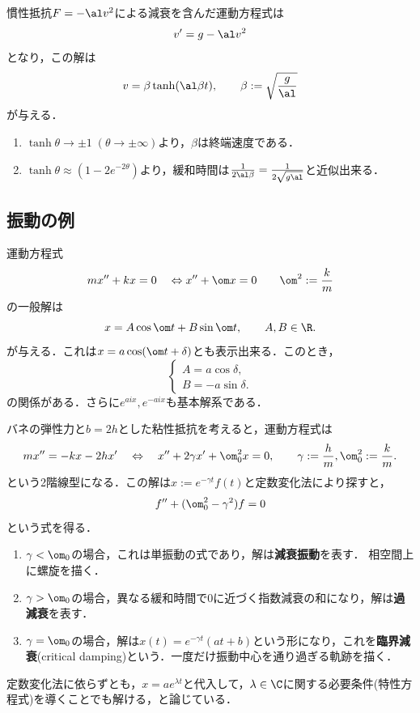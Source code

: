 \documentclass[uplatex,dvipdfmx]{jsreport}
\begin{document}
\begin{model}
    慣性抵抗$F=-\al v^2$による減衰を含んだ運動方程式は
    \[v'=g-\al v^2\]
    となり，この解は
    \[v=\beta\tanh(\al\beta t),\qquad\beta:=\sqrt{\frac{g}{\al}}\]
    が与える．
    \begin{enumerate}
        \item $\tanh\theta\to\pm1\;(\theta\to\pm\infty)$より，$\beta$は終端速度である．
        \item $\tanh\theta\approx(1-2e^{-2\theta})$より，緩和時間は$\frac{1}{2\al\beta}=\frac{1}{2\sqrt{g\al}}$と近似出来る．
    \end{enumerate}
\end{model}

\subsection{振動の例}

\begin{model}\label{model-単振動}
    運動方程式
    \[mx''+kx=0\quad\Leftrightarrow x''+\om x=0\qquad\om^2:=\frac{k}{m}\]
    の一般解は
    \[x=A\cos\om t+B\sin\om t,\qquad A,B\in\R.\]
    が与える．これは$x=a\cos(\om t+\delta)$とも表示出来る．このとき，
    \[\begin{cases}
        A=a\cos\delta,\\
        B=-a\sin\delta.
    \end{cases}\]
    の関係がある．さらに$e^{aix},e^{-aix}$も基本解系である．
\end{model}

\begin{model}
    バネの弾性力と$b=2h$とした粘性抵抗を考えると，運動方程式は
    \[mx''=-kx-2hx'\quad\Leftrightarrow\quad x''+2\gamma x'+\om_0^2x=0,\qquad\gamma:=\frac{h}{m},\om^2_0:=\frac{k}{m}.\]
    という2階線型になる．この解は$x:=e^{-\gamma t}f(t)$と定数変化法により探すと，
    \[f''+(\om_0^2-\gamma^2)f=0\]
    という式を得る．
    \begin{enumerate}
        \item $\gamma<\om_0$の場合，これは単振動の式であり，解は\textbf{減衰振動}を表す．
        相空間上に螺旋を描く．
        \item $\gamma>\om_0$の場合，異なる緩和時間で$0$に近づく指数減衰の和になり，解は\textbf{過減衰}を表す．
        \item $\gamma=\om_0$の場合，解は$x(t)=e^{-\gamma t}(at+b)$という形になり，これを\textbf{臨界減衰}(critical damping)という．一度だけ振動中心を通り過ぎる軌跡を描く．
    \end{enumerate}
    定数変化法に依らずとも，$x=ae^{\lambda t}$と代入して，$\lambda\in\C$に関する必要条件(特性方程式)を導くことでも解ける，と論じている\cite{基幹講座力学}．
\end{model}
\end{document}
